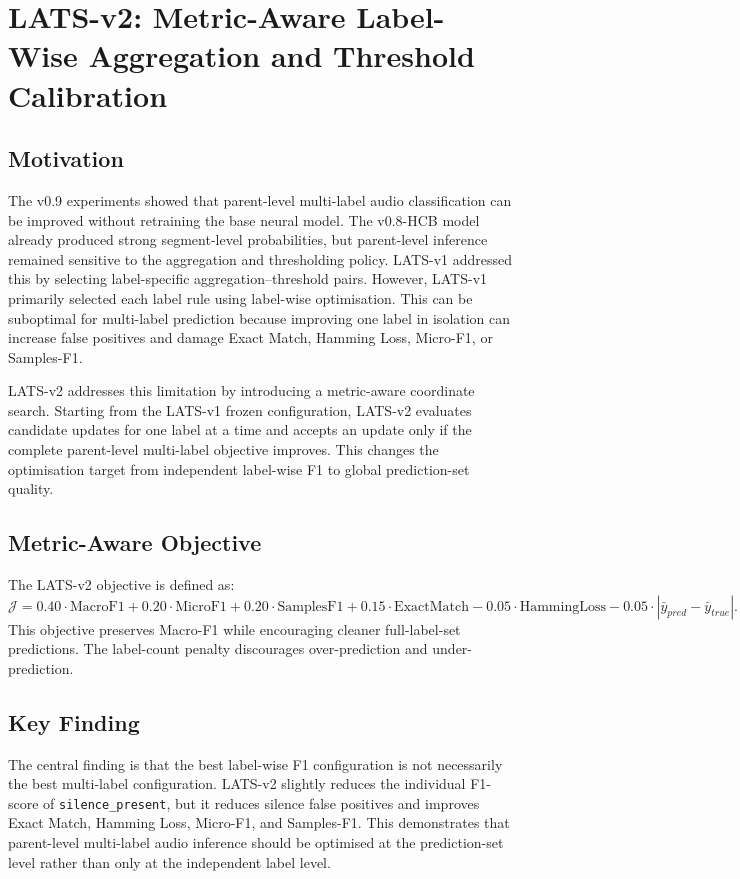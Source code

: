 
\section{LATS-v2: Metric-Aware Label-Wise Aggregation and Threshold Calibration}

\subsection{Motivation}
The v0.9 experiments showed that parent-level multi-label audio classification can be improved without retraining the base neural model. The v0.8-HCB model already produced strong segment-level probabilities, but parent-level inference remained sensitive to the aggregation and thresholding policy. LATS-v1 addressed this by selecting label-specific aggregation--threshold pairs. However, LATS-v1 primarily selected each label rule using label-wise optimisation. This can be suboptimal for multi-label prediction because improving one label in isolation can increase false positives and damage Exact Match, Hamming Loss, Micro-F1, or Samples-F1.

LATS-v2 addresses this limitation by introducing a metric-aware coordinate search. Starting from the LATS-v1 frozen configuration, LATS-v2 evaluates candidate updates for one label at a time and accepts an update only if the complete parent-level multi-label objective improves. This changes the optimisation target from independent label-wise F1 to global prediction-set quality.

\subsection{Metric-Aware Objective}
The LATS-v2 objective is defined as:
\begin{equation}
\mathcal{J}
=
0.40\cdot\mathrm{MacroF1}
+0.20\cdot\mathrm{MicroF1}
+0.20\cdot\mathrm{SamplesF1}
+0.15\cdot\mathrm{ExactMatch}
-0.05\cdot\mathrm{HammingLoss}
-0.05\cdot |\bar{y}_{pred}-\bar{y}_{true}|.
\end{equation}
This objective preserves Macro-F1 while encouraging cleaner full-label-set predictions. The label-count penalty discourages over-prediction and under-prediction.

\subsection{Key Finding}
The central finding is that the best label-wise F1 configuration is not necessarily the best multi-label configuration. LATS-v2 slightly reduces the individual F1-score of \texttt{silence\_present}, but it reduces silence false positives and improves Exact Match, Hamming Loss, Micro-F1, and Samples-F1. This demonstrates that parent-level multi-label audio inference should be optimised at the prediction-set level rather than only at the independent label level.
